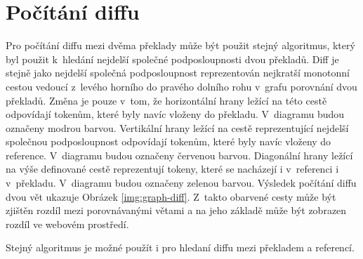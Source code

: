 \section{Počítání diffu}
Pro počítání diffu mezi dvěma překlady může být použit stejný algoritmus,
  který byl použit k~hledání nejdelší společné podposloupnosti dvou překladů.
Diff je stejně jako nejdelší společná podposloupnost reprezentován nejkratší monotonní cestou vedoucí z~levého horního do pravého dolního rohu v~grafu porovnání dvou překladů.
Změna je pouze v~tom, že horizontální hrany ležící na této cestě odpovídají tokenům,
  které byly navíc vloženy do překladu.
V~diagramu budou označeny modrou barvou.
Vertikální hrany ležící na cestě reprezentující nejdelší společnou podposloupnost odpovídají tokenům,
  které byly navíc vloženy do reference.
V~diagramu budou označeny červenou barvou.
Diagonální hrany ležící na výše definované cestě reprezentují tokeny,
  které se nacházejí i v~referenci i v~překladu.
V~diagramu budou označeny zelenou barvou.
Výsledek počítání diffu dvou vět ukazuje Obrázek \ref{img:graph-diff}.
Z~takto obarvené cesty může být zjištěn rozdíl mezi porovnávanými větami
  a na jeho základě může být zobrazen rozdíl ve webovém prostředí.

Stejný algoritmus je možné použít i pro hledaní diffu mezi překladem a referencí.


